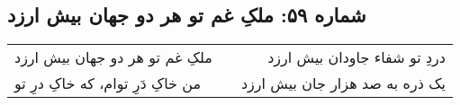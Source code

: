 \begin{center}
\section*{شماره ۵۹: ملکِ غم تو هر دو جهان بیش ارزد}
\label{sec:059}
\begin{longtable}{l p{0.5cm} r}
ملکِ غم تو هر دو جهان بیش ارزد
&&
دردِ تو شفاء جاودان بیش ارزد
\\
من خاکِ دَرِ توام، که خاکِ درِ تو
&&
یک ذره به صد هزار جان بیش ارزد
\\
\end{longtable}
\end{center}
